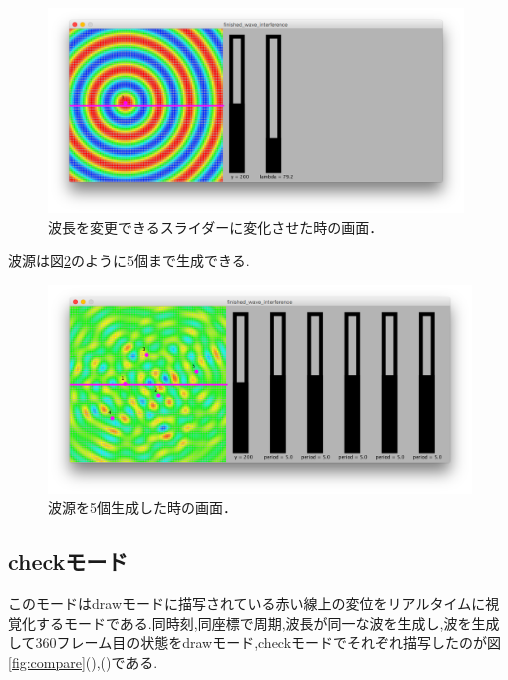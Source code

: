 \begin{figure}[H]
 \begin{center}
  \includegraphics[width=110mm]{../result/wavechangelambda.png}
 \end{center}
 \caption{波長を変更できるスライダーに変化させた時の画面．}
 \label{fig:wavechangelambda}
\end{figure}
\newpage
波源は図\ref{fig:5wave}のように5個まで生成できる.
\begin{figure}[htbp]
 \begin{center}
  \includegraphics[width=\linewidth]{../result/5wave.png}
 \end{center}
 \caption{波源を5個生成した時の画面．}
 \label{fig:5wave}
\end{figure}
\subsection{checkモード}
\label{sec:check}
このモードはdrawモードに描写されている赤い線上の変位をリアルタイムに視覚化するモードである.同時刻,同座標で周期,波長が同一な波を生成し,波を生成して360フレーム目の状態をdrawモード,checkモードでそれぞれ描写したのが図\ref{fig:compare}(),()である.


